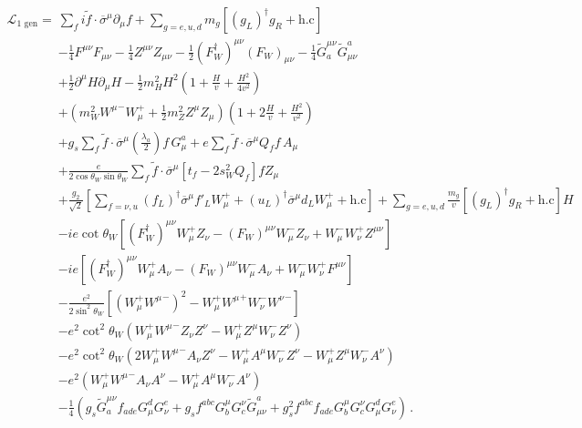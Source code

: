 \begin{align*}
   \mathcal{L}_{\text{1 gen}}=&
\sum_f  i \widetilde{f}\cdot\overline{\sigma}^\mu\partial_\mu f 
+\sum_{g=e,u,d} m_g \left[ \left( g_L \right)^{\dagger} g_R+\text{h.c} \right]
\nonumber\\
&-\tfrac{1}{4}F^{\mu\nu} F_{\mu\nu}-\tfrac{1}{4}Z^{\mu\nu} Z_{\mu\nu}-\tfrac{1}{2}(F_W^\dagger)^{\mu\nu} (F_W)_{\mu\nu}
- \tfrac{1}{4}\widetilde{G}^{\mu\nu}_a \widetilde{G}_{\mu\nu}^a\nonumber\\
&+\tfrac{1}{2}\partial^\mu H\partial_\mu H
-\frac{1}{2}m_H^2H^2\left(1+\frac{H}{v}+\frac{H^2}{4v^2}\right)\nonumber\\
&+\left(m_W^2{W^\mu}^-W_\mu^++\frac{1}{2}m_Z^2Z^\mu Z_\mu\right)\left(1+2\frac{H}{v}+\frac{H^2}{v^2}\right)\nonumber\\
&+g_s\sum_f  \widetilde{f}\cdot\overline{\sigma}^\mu \left( \frac{\lambda_a}{2} \right) f\, G_\mu^a+e\sum_f  \widetilde{f}\cdot\overline{\sigma}^\mu Q_f f\, A_\mu \nonumber\\
&+\frac{e}{2\cos\theta_W \sin\theta_W} \sum_f\widetilde{f}\cdot\overline{\sigma}^{\mu}\left[t_f-2s_W^2Q_f\right]f Z_\mu \nonumber\\
&+\frac{g_2}{\sqrt{2}}\left[\sum_{f=\nu,u}(f_L)^\dagger \overline{\sigma}^\mu f'_LW_\mu^++
(u_L)^\dagger \overline{\sigma}^\mu d_LW_\mu^++\text{h.c}\right]
+\sum_{g=e,u,d} \frac{m_g}{v} \left[ \left( g_L \right)^{\dagger} g_R+\text{h.c} \right]H\nonumber\\
&-ie\cot\theta_W\left[(F_W^\dagger)^{\mu\nu}W_\mu^+ Z_\nu-(F_W)^{\mu\nu}W_\mu^- Z_\nu+W_\mu^-W_\nu^+Z^{\mu\nu}\right]\nonumber\\
&-ie\left[(F_W^\dagger)^{\mu\nu}W_\mu^+ A_\nu-(F_W)^{\mu\nu}W_\mu^- A_\nu+W_\mu^-W_\nu^+F^{\mu\nu}\right]\nonumber\\
&-\frac{e^2}{2\sin^2\theta_W}\left[\left(W_\mu^+{W^\mu}^-\right)^2-W_\mu^+{W^\mu}^+W_\nu^-{W^\nu}^-\right]\nonumber\\
&-e^2\cot^2\theta_W\left(W_\mu^+{W^\mu}^-Z_\nu Z^\nu-W_\mu^+Z^\mu W_\nu^-Z^\nu\right)\nonumber\\
&-e^2\cot^2\theta_W\left(2W_\mu^+{W^\mu}^-A_\nu Z^\nu-W_\mu^+A^\mu W_\nu^-Z^\nu-W_\mu^+Z^\mu W_\nu^-A^\nu\right)\nonumber\\
&-e^2\left(W_\mu^+{W^\mu}^-A_\nu A^\nu-W_\mu^+A^\mu W_\nu^-A^\nu\right)\nonumber\\
&- \frac{1}{4}\left(g_s\widetilde{G}^{\mu\nu}_af_{a d e}G^d_\mu G^e_\nu
    +g_sf^{a b c}G_b^\mu G_c^\nu\widetilde{G}_{\mu\nu}^a
    +g_s^2f^{a b c}f_{a d e}G_b^\mu G_c^\nu G^d_\mu G^e_\nu\right)\,.
\end{align*}

